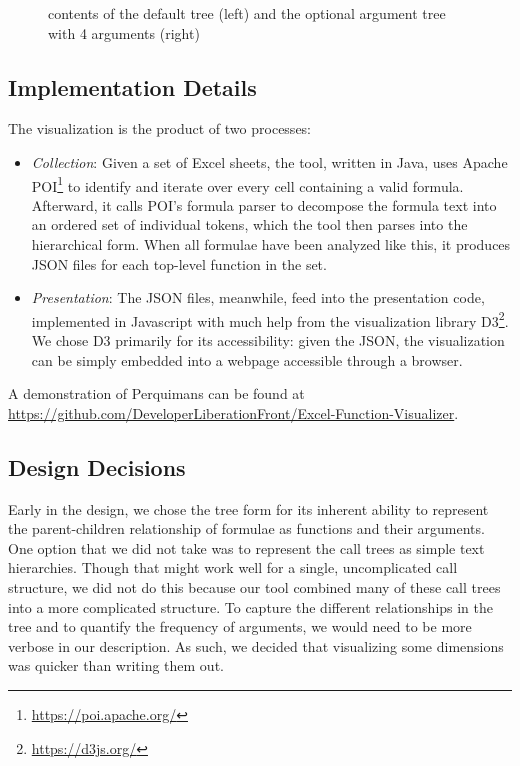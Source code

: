\documentclass[conference]{IEEEtran}
\newcommand{\toolname}{Perquimans\xspace} \newcommand{\toolnameend}{Perquimans}
\begin{document}
\begin{figure}[h]
{			contents of the default tree (left) and the optional argument tree with 4 arguments (right)}
		\label{fig:optional} \end{figure}
	
	
	
	\subsection{Implementation Details} The visualization is the product of two processes: \begin{itemize} \item \textit{Collection}: Given a set of
		Excel sheets, the tool, written in Java, uses Apache
		POI\footnote{\href{https://poi.apache.org/}{https://poi.apache.org/}} to identify and iterate over every cell
		containing a valid formula. Afterward, it calls POI's formula parser to decompose
		the formula text into an ordered set of individual tokens, which the tool then
		parses into the hierarchical form. When all formulae have been analyzed like this,
		it produces JSON files for each top-level function in the set.
		
		\item \textit{Presentation}: The JSON files, meanwhile, feed into the
		presentation code, implemented in Javascript with much help from the
		visualization library D3\footnote{\href{https://d3js.org/}{https://d3js.org/}}. We chose D3 primarily
		for its accessibility: given the JSON, the visualization can be simply
		embedded into a webpage accessible through a browser. \end{itemize} A
	demonstration of \toolname can be found at
	\href{https://github.com/DeveloperLiberationFront/Excel-Function-Visualizer}{https://github.com/DeveloperLiberationFront/Excel-Function-Visualizer}.
	
	\subsection{Design Decisions} \label{ssec:decisions} Early in the design, we
	chose the tree form for its inherent ability to represent the parent-children
	relationship of formulae as functions and their arguments. One option that we did not take was to represent the call trees
	as simple text hierarchies. Though that might work well for a single,
	uncomplicated call structure, we did not do this because our tool combined many
	of these call trees into a more complicated structure. To capture the different
	relationships in the tree and to quantify the frequency of arguments, we would
	need to be more verbose in our description. As such, we decided that
	visualizing some dimensions was quicker than writing them out.
	
\end{document}
